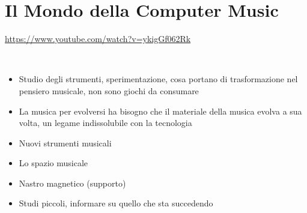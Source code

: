 
\section{Il Mondo della Computer Music}

\url{https://www.youtube.com/watch?v=ykigGf062Rk}

~\vfill

\Large

\begin{itemize}
\item Studio degli strumenti, sperimentazione, cosa portano di trasformazione nel pensiero musicale, non sono giochi da consumare
\item La musica per evolversi ha bisogno che il materiale della musica evolva a sua volta, un legame indissolubile con la tecnologia
\item Nuovi strumenti musicali
\item Lo spazio musicale
\item Nastro magnetico (supporto)
\item Studi piccoli, informare su quello che sta succedendo
\end{itemize}

\clearpage